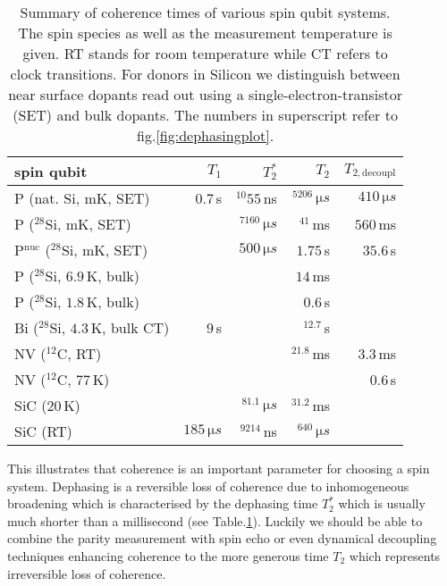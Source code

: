 \bgroup
\def\arraystretch{1.3}%
\begin{table}[H]
	\begin{tabular}{lrrrr}
		\hline
		spin qubit & $T_1$ & $T_2^{*}$ & $T_2$ & $T_{2,\textrm{decoupl}}$ \\ \hline 
		P (nat. Si, mK, SET) \cite{Pla2012}& $0.7\, $s & $^{10}55\, $ns  & $^5206\, \si{\micro s}$ & $410\, \si{\micro s}$  \\
		P ($^{28}$Si, mK, SET) \cite{Muhonen2014}&  & $^7160\, \si{\micro s}$  & $^41\, $ms & $560\, $ms \\
		P$^{\text{nuc}}$ ($^{28}$Si, mK, SET) \cite{Muhonen2014}& & $500\, \si{\micro s}$ & $1.75\, $s & $35.6\, $s \\
		P ($^{28}$Si, $6.9\, $K, bulk) \cite{Morley2010}& &  & $14\, $ms &  \\
		P ($^{28}$Si, $1.8\, $K, bulk) \cite{Tyryshkin2011}& &  & $0.6\, $s &  \\
		Bi ($^{28}$Si, $4.3\, $K, bulk CT) \cite{Wolfowicz2013} & $9\, $s &  & $^12.7\, $s &\\
		NV ($^{12}$C, RT) \cite{Balasubramanian2009,Bar-Gill2013} & & & $^21.8\, $ms & $3.3\, $ms \\
		NV ($^{12}$C, $77\, $K) \cite{Bar-Gill2013} & & &  & $0.6\, $s \\
		SiC ($20\, $K) \cite{Christle2014} & & $^81.1\, \si{\micro s}$ & $^31.2\, $ms &  \\
		SiC (RT) \cite{Koehl2011} & $185\, \si{\micro s}$ & $^9214\, $ns & $^640\, \si{\micro s}$ &   \\
		\hline
	\end{tabular} 
	\caption{Summary of coherence times of various spin qubit systems. The spin species as well as the measurement temperature is given. RT stands for room temperature while CT refers to clock transitions. For donors in Silicon we distinguish between near surface dopants read out using a single-electron-transistor (SET) and bulk dopants. The numbers in superscript refer to fig.\@ \ref{fig:dephasingplot}.}
	\label{TAB:qubits}
\end{table}
\egroup


This illustrates that coherence is an important parameter for choosing a spin system. Dephasing is a reversible loss of coherence due to inhomogeneous broadening which is characterised by the dephasing time $T_2^*$ which is usually much shorter than a millisecond (see Table.\@ \ref{TAB:qubits}). Luckily we should be able to combine the parity measurement with spin echo or even dynamical decoupling techniques enhancing coherence to the more generous time $T_2$ which represents irreversible loss of coherence.

